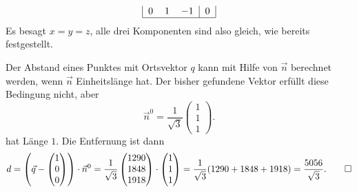 \begin{loesung}
\begin{teilaufgaben}
\[\begin{tabular}{|ccc|c|}
0& 1&$-1$&0\\
\hline
\end{tabular}
\]
Es besagt $x=y=z$, alle drei Komponenten sind also gleich,
wie bereits festgestellt.
\item Der Abstand eines Punktes mit Ortsvektor $q$ kann mit Hilfe von
$\vec n$ berechnet werden, wenn $\vec n$ Einheitslänge hat. Der bisher
gefundene Vektor erfüllt diese Bedingung nicht, aber
\[
\vec n^0=\frac1{\sqrt{3}}\begin{pmatrix}1\\1\\1\end{pmatrix}.
\]
hat Länge $1$.
Die Entfernung ist dann
\[
d=\left(\vec q- \begin{pmatrix}1\\0\\0\end{pmatrix}\right)\cdot\vec n^0
=
\frac1{\sqrt{3}}\begin{pmatrix}1290\\1848\\1918\end{pmatrix}
\cdot
\begin{pmatrix}1\\1\\1\end{pmatrix}
=\frac1{\sqrt{3}}(1290+1848+1918)=\frac{5056}{\sqrt{3}}.
\qedhere
\]
\end{teilaufgaben}
\end{loesung}

